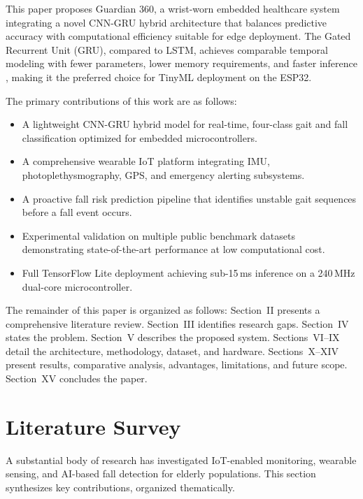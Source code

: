 \documentclass[conference]{IEEEtran}
\begin{document}
This paper proposes Guardian 360, a wrist-worn embedded healthcare system integrating a novel CNN-GRU hybrid architecture that balances predictive accuracy with computational efficiency suitable for edge deployment. The Gated Recurrent Unit (GRU), compared to LSTM, achieves comparable temporal modeling with fewer parameters, lower memory requirements, and faster inference \cite{gru_orig}, making it the preferred choice for TinyML deployment on the ESP32.

The primary contributions of this work are as follows:
\begin{itemize}
  \item A lightweight CNN-GRU hybrid model for real-time, four-class gait and fall classification optimized for embedded microcontrollers.
  \item A comprehensive wearable IoT platform integrating IMU, photoplethysmography, GPS, and emergency alerting subsystems.
  \item A proactive fall risk prediction pipeline that identifies unstable gait sequences before a fall event occurs.
  \item Experimental validation on multiple public benchmark datasets demonstrating state-of-the-art performance at low computational cost.
  \item Full TensorFlow Lite deployment achieving sub-15\,ms inference on a 240\,MHz dual-core microcontroller.
\end{itemize}

The remainder of this paper is organized as follows: Section~II presents a comprehensive literature review. Section~III identifies research gaps. Section~IV states the problem. Section~V describes the proposed system. Sections~VI--IX detail the architecture, methodology, dataset, and hardware. Sections~X--XIV present results, comparative analysis, advantages, limitations, and future scope. Section~XV concludes the paper.

\section{Literature Survey}

A substantial body of research has investigated IoT-enabled monitoring, wearable sensing, and AI-based fall detection for elderly populations. This section synthesizes key contributions, organized thematically.
\end{document}
